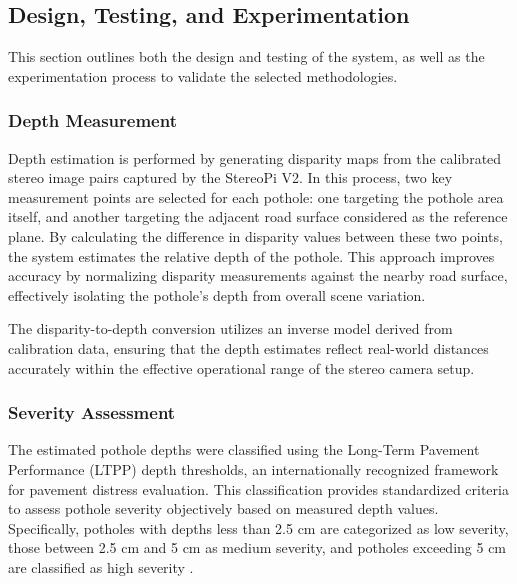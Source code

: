 
\subsection{Design, Testing, and Experimentation}
This section outlines both the design and testing of the system, as well as the experimentation process to validate the selected methodologies. 

\subsubsection{Depth Measurement}
Depth estimation is performed by generating disparity maps from the calibrated stereo image pairs captured by the StereoPi V2. In this process, two key measurement points are selected for each pothole: one targeting the pothole area itself, and another targeting the adjacent road surface considered as the reference plane. By calculating the difference in disparity values between these two points, the system estimates the relative depth of the pothole. This approach improves accuracy by normalizing disparity measurements against the nearby road surface, effectively isolating the pothole’s depth from overall scene variation.

The disparity-to-depth conversion utilizes an inverse model derived from calibration data, ensuring that the depth estimates reflect real-world distances accurately within the effective operational range of the stereo camera setup.

\subsubsection{Severity Assessment}

The estimated pothole depths were classified using the Long-Term Pavement Performance (LTPP) depth thresholds, an internationally recognized framework for pavement distress evaluation. This classification provides standardized criteria to assess pothole severity objectively based on measured depth values. Specifically, potholes with depths less than 2.5 cm are categorized as low severity, those between 2.5 cm and 5 cm as medium severity, and potholes exceeding 5 cm are classified as high severity \cite{miller2014}.


